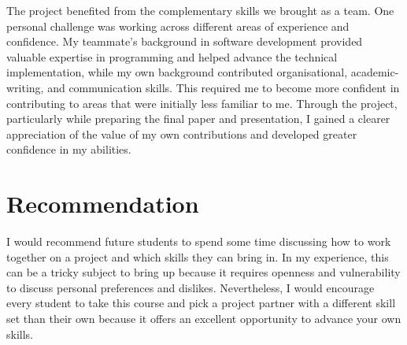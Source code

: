 \documentclass[runningheads]{llncs}
\begin{document}
The project benefited from the complementary skills we brought as a team. One personal challenge was working across different areas of experience and confidence. My teammate’s background in software development provided valuable expertise in programming and helped advance the technical implementation, while my own background contributed organisational, academic-writing, and communication skills. This required me to become more confident in contributing to areas that were initially less familiar to me. Through the project, particularly while preparing the final paper and presentation, I gained a clearer appreciation of the value of my own contributions and developed greater confidence in my abilities.


\section{Recommendation}
I would recommend future students to spend some time discussing how to work together on a project and which skills they can bring in. In my experience, this can be a tricky subject to bring up because it requires openness and vulnerability to discuss personal preferences and dislikes. Nevertheless, I would encourage every student to take this course and pick a project partner with a different skill set than their own because it offers an excellent opportunity to advance your own skills.
\end{document}
